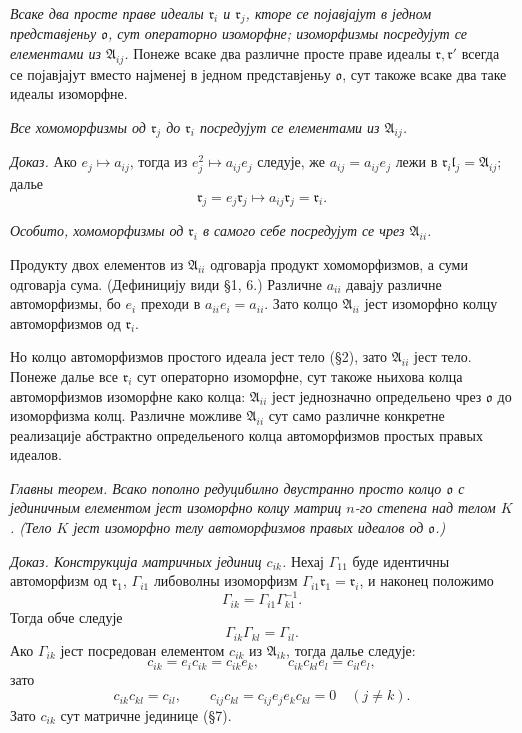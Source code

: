 ﻿\documentclass[11pt]{article}
\providecommand{\mA}{\mathfrak{A}}
\providecommand{\ml}{\mathfrak{l}}
\providecommand{\mo}{\mathfrak{o}}
\providecommand{\mr}{\mathfrak{r}}
\begin{document}
\emph{Всаке два просте праве идеалы $\mr_i$ и $\mr_j$, кторе се појавјајут в једном представјеньу $\mo$, сут операторно изоморфне; изоморфизмы посредујут се елементами из $\mA_{ij}$.} Понеже всаке два различне просте праве идеалы $\mr,\mr'$ всегда се појавјајут вместо најменеј в једном представјеньу $\mo$, сут такоже всаке два таке идеалы изоморфне.

\emph{Все хомоморфизмы од $\mr_j$ до $\mr_i$ посредујут се елементами из $\mA_{ij}$.}

\emph{Доказ.} Ако $e_j\mapsto a_{ij}$, тогда из $e_j^2\mapsto a_{ij}e_j$ следује, же $a_{ij}=a_{ij}e_j$ лежи в $\mr_i\ml_j=\mA_{ij}$; далье
\[
        \mr_j=e_j\mr_j\mapsto a_{ij}\mr_j=\mr_i.
\]

\emph{Особито, хомоморфизмы од $\mr_i$ в самого себе посредујут се чрез $\mA_{ii}$.}

Продукту двох елементов из $\mA_{ii}$ одговарја продукт хомоморфизмов, а суми одговарја сума. (Дефиницију види §1, 6.) Различне $a_{ii}$ давају различне автоморфизмы, бо $e_i$ преходи в $a_{ii}e_i=a_{ii}$. Зато колцо $\mA_{ii}$ јест изоморфно колцу автоморфизмов од $\mr_i$.

Но колцо автоморфизмов простого идеала јест тело (§2), зато $\mA_{ii}$ јест тело. Понеже далье все $\mr_i$ сут операторно изоморфне, сут такоже ньихова колца автоморфизмов изоморфне како колца: $\mA_{ii}$ јест једнозначно определьено чрез $\mo$ до изоморфизма колц. Различне можливе $\mA_{ii}$ сут само различне конкретне реализације абстрактно определьеного колца автоморфизмов простых правых идеалов.

\emph{Главны теорем. Всако пополно редуцибилно двустранно просто колцо $\mo$ с јединичным елементом јест изоморфно колцу матриц $n$-го степена над телом $K$. (Тело $K$ јест изоморфно телу автоморфизмов правых идеалов од $\mo$.)}

\emph{Доказ. Конструкција матричных јединиц $c_{ik}$.} Нехај $\Gamma_{11}$ буде идентичны автоморфизм од $\mr_1$, $\Gamma_{i1}$ либоволны изоморфизм $\Gamma_{i1}\mr_1=\mr_i$, и наконец положимо
\[
        \Gamma_{ik}=\Gamma_{i1}\Gamma_{k1}^{-1}.
\]
Тогда обче следује
\[
        \Gamma_{ik}\Gamma_{kl}=\Gamma_{il}.
\]
Ако $\Gamma_{ik}$ јест посредован елементом $c_{ik}$ из $\mA_{ik}$, тогда далье следује:
\[
        c_{ik}=e_i c_{ik}=c_{ik}e_k,
        \qquad
        c_{ik}c_{kl}e_l=c_{il}e_l,
\]
зато
\[
        c_{ik}c_{kl}=c_{il},
        \qquad
        c_{ij}c_{kl}=c_{ij}e_j e_k c_{kl}=0\quad(j\ne k).
\]
Зато $c_{ik}$ сут матричне јединице (§7).
\end{document}
